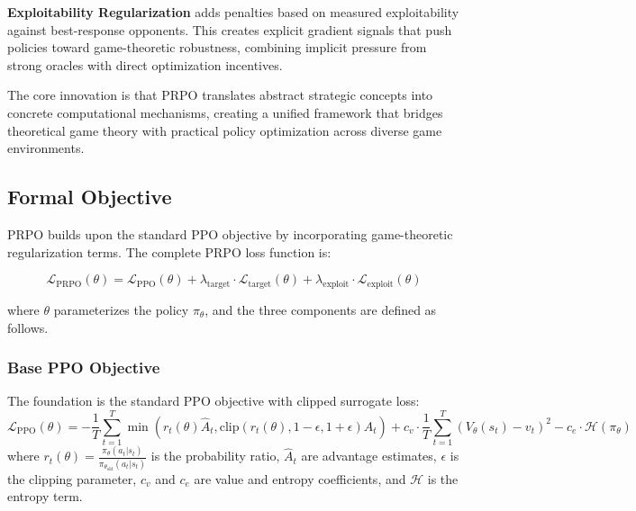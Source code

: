 \documentclass[sigconf,anonymous]{aamas}
\begin{document}
\textbf{Exploitability Regularization} adds penalties based on measured exploitability against best-response opponents. This creates explicit gradient signals that push policies toward game-theoretic robustness, combining implicit pressure from strong oracles with direct optimization incentives.

The core innovation is that PRPO translates abstract strategic concepts into concrete computational mechanisms, creating a unified framework that bridges theoretical game theory with practical policy optimization across diverse game environments.

\subsection{Formal Objective}

PRPO builds upon the standard PPO objective by incorporating game-theoretic regularization terms. The complete PRPO loss function is:

\begin{equation}
\mathcal{L}_{\text{PRPO}}(\theta) = \mathcal{L}_{\text{PPO}}(\theta) + \lambda_{\text{target}} \cdot \mathcal{L}_{\text{target}}(\theta) + \lambda_{\text{exploit}} \cdot \mathcal{L}_{\text{exploit}}(\theta)
\end{equation}

where \(\theta\) parameterizes the policy \(\pi_\theta\), and the three components are defined as follows.

\subsubsection{Base PPO Objective}
The foundation is the standard PPO objective with clipped surrogate loss:
\begin{equation}
\mathcal{L}_{\text{PPO}}(\theta) = -\frac{1}{T} \sum_{t=1}^T \min\left( r_t(\theta) \hat{A}_t, \text{clip}(r_t(\theta), 1-\epsilon, 1+\epsilon) \hat{A}_t \right) + c_v \cdot \frac{1}{T} \sum_{t=1}^T (V_\theta(s_t) - v_t)^2 - c_e \cdot \mathcal{H}(\pi_\theta)
\end{equation}
where \(r_t(\theta) = \frac{\pi_\theta(a_t|s_t)}{\pi_{\theta_{\text{old}}}(a_t|s_t)}\) is the probability ratio, \(\hat{A}_t\) are advantage estimates, \(\epsilon\) is the clipping parameter, \(c_v\) and \(c_e\) are value and entropy coefficients, and \(\mathcal{H}\) is the entropy term.
\end{document}
